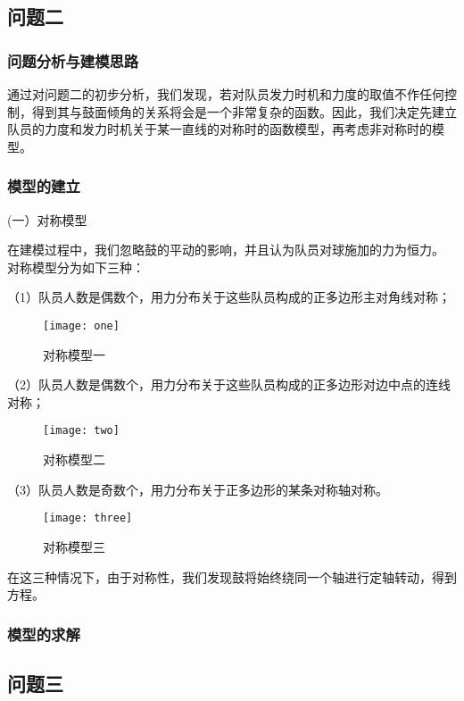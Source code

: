\documentclass[withoutpreface,bwprint]{cumcmthesis} %
\begin{document}

\subsection{问题二}
	\subsubsection{问题分析与建模思路}
通过对问题二的初步分析，我们发现，若对队员发力时机和力度的取值不作任何控制，得到其与鼓面倾角的关系将会是一个非常复杂的函数。因此，我们决定先建立队员的力度和发力时机关于某一直线的对称时的函数模型，再考虑非对称时的模型。

	\subsubsection{模型的建立}
(一）对称模型 \par
在建模过程中，我们忽略鼓的平动的影响，并且认为队员对球施加的力为恒力。
对称模型分为如下三种：\par
（1）队员人数是偶数个，用力分布关于这些队员构成的正多边形主对角线对称；
\begin{figure}[!hbtp]
    \centering
    \texttt{[image: one]}
    \caption{对称模型一}
    \label{fig:one}
\end{figure}\par
（2）队员人数是偶数个，用力分布关于这些队员构成的正多边形对边中点的连线对称；
\begin{figure}[!hbtp]
    \centering
    \texttt{[image: two]}
    \caption{对称模型二}
    \label{fig:two}
\end{figure}\par
（3）队员人数是奇数个，用力分布关于正多边形的某条对称轴对称。
\begin{figure}[!hbtp]
    \centering
    \texttt{[image: three]}
    \caption{对称模型三}
    \label{fig:three}
\end{figure}\par
在这三种情况下，由于对称性，我们发现鼓将始终绕同一个轴进行定轴转动，得到方程。

	\subsubsection{模型的求解}

\subsection{问题三}
\end{document}

